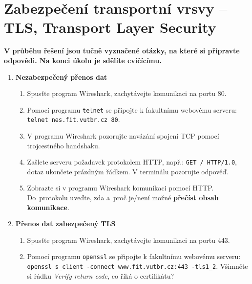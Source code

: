 \documentclass[a4paper,11pt]{article}
\begin{document}
\section{Zabezpečení transportní vrsvy -- TLS, Transport Layer Security}

{\bf V průběhu řešení jsou tučně vyznačené otázky, na které si připravte odpovědi.
  Na konci úkolu je sdělíte cvičícímu.}

\begin{enumerate}

  \item {\bf  Nezabezpečený přenos dat}

    \begin{enumerate}

      \item Spusťte program Wireshark, zachytávejte komunikaci na portu 80.

      \item Pomocí programu {\tt telnet} se připojte k fakultnímu webovému
        serveru: \\ \verb|telnet nes.fit.vutbr.cz 80|.

      \item V programu Wireshark pozorujte navázání spojení TCP pomocí
        trojcestného handshaku.

      \item Zašlete serveru požadavek protokolem HTTP, např.:
        \verb|GET / HTTP/1.0|, dotaz ukončete prázdným řádkem. V terminálu pozorujte
        odpověď.

      \item Zobrazte si v programu Wireshark komunikaci pomocí HTTP.
      Do~protokolu uveďte, zda a~proč je/není možné \textbf{přečíst obsah komunikace}.

    \end{enumerate}

  \item {\bf Přenos dat zabezpečený TLS}

    \begin{enumerate}

      \item Spusťte program Wireshark, zachytávejte komunikaci na portu 443.

      \item Pomocí programu {\tt openssl} se připojte k fakultnímu webovému
        serveru: \\ \verb|openssl s_client -connect www.fit.vutbr.cz:443 -tls1_2|.
        Všimněte si řádku \emph{Verify return code}, co
        říká o certifikátu?


\end{enumerate}
\end{enumerate}
\end{document}
